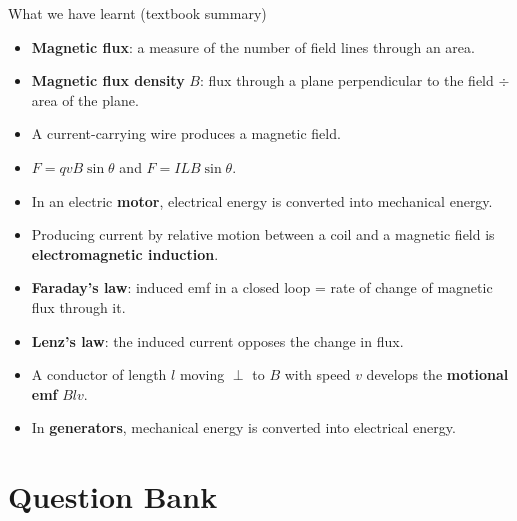 \documentclass[aspectratio=169,10pt,xcolor=table]{beamer}
\begin{document}
\begin{frame}{What we have learnt (textbook summary)}
\small
\begin{itemize}
\item \textbf{Magnetic flux}: a measure of the number of field lines through an area.
\item \textbf{Magnetic flux density} $B$: flux through a plane perpendicular to the field $\div$ area of the plane.
\item A current-carrying wire produces a magnetic field.
\item $F=qvB\sin\theta$ and $F=ILB\sin\theta$.
\item In an electric \textbf{motor}, electrical energy is converted into mechanical energy.
\item Producing current by relative motion between a coil and a magnetic field is \textbf{electromagnetic induction}.
\item \textbf{Faraday's law}: induced emf in a closed loop = rate of change of magnetic flux through it.
\item \textbf{Lenz's law}: the induced current opposes the change in flux.
\item A conductor of length $l$ moving $\perp$ to $B$ with speed $v$ develops the \textbf{motional emf} $Blv$.
\item In \textbf{generators}, mechanical energy is converted into electrical energy.
\end{itemize}
\end{frame}

\section{Question Bank}
\end{document}
